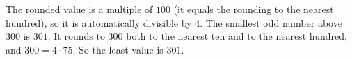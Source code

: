 The rounded value is a multiple of $100$ (it equals the rounding to the nearest hundred), so it is automatically divisible by $4$. The smallest odd number above $300$ is $301$. It rounds to $300$ both to the nearest ten and to the nearest hundred, and $300=4\cdot75$. So the least value is $\boxed{301}$.
